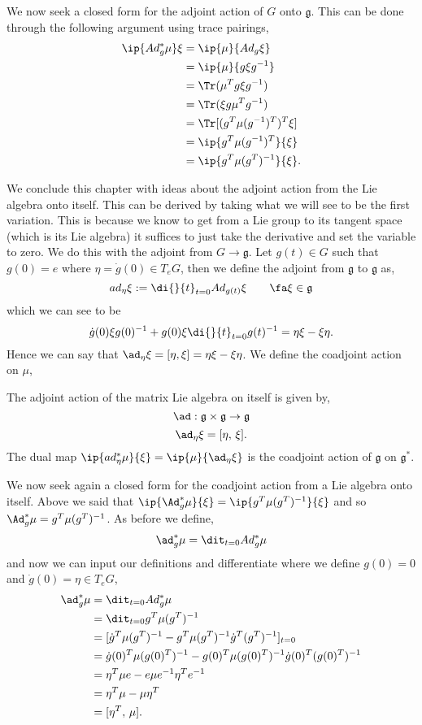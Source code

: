 \noindent
We now seek a closed form for the adjoint action of $G$ onto $\mathfrak{g}$. This can be done through the following argument using trace pairings,
\begin{align*}
  \ip {Ad^*_g \mu} \xi &= \ip {\mu} {Ad_g\xi}\\
  &= \ip {\mu} {g\xi g^{-1}}\\
  &= \Tr(\mu^Tg\xi g^{-1})\\
  &= \Tr(\xi g\mu^Tg^{-1})\\
  &= \Tr [(g^T\mu(g^{-1})^T)^T\xi]\\
  &= \ip{g^T\mu (g^{-1})^T} {\xi}\\
  &= \ip{g^T\mu (g^T)^{-1}} {\xi}.
\end{align*}

\noindent
We conclude this chapter with ideas about the adjoint action from the Lie algebra onto itself. This can be derived by taking what we will see to be the first variation. This is because we know to get from a Lie group to its tangent space (which is its Lie algebra) it suffices to just take the derivative and set the variable to zero. We do this with the adjoint from $G \to \mathfrak{g}$. Let $g(t) \in G$ such that $g(0) = e$ where $\eta = \dot g (0) \in T_eG$, then we define the adjoint from $\mathfrak{g}$ to $\mathfrak{g}$ as,
$$ ad_\eta \xi := \di {}{t} _{t = 0} Ad_{g(t)}\xi \qquad \fa \xi \in \mathfrak{g} $$
which we can see to be
$$ \dot g(0)\xi g(0)^{-1} + g(0)\xi \di {}{t}_{t=0} g(t)^{-1}= \eta\xi - \xi\eta. $$
Hence we can say that $\ad_{\eta}\xi = [\eta, \xi] = \eta\xi - \xi\eta$. We define the coadjoint action on $\mu$,
\begin{ndefi}
  The adjoint action of the matrix Lie algebra on itself is given by,
  $$ \ad : \mathfrak{g}\times \mathfrak{g} \to \mathfrak{g} $$
  $$ \ad_\eta \xi = [\eta,\, \xi]. $$
  The dual map $\ip{ad^*_\eta \mu}{\xi} = \ip{\mu}{\ad_\eta \xi}$ is the coadjoint action of $\mathfrak{g}$ on $\mathfrak{g}^*$.
\end{ndefi}
\noindent
We now seek again a closed form for the coadjoint action from a Lie algebra onto itself. Above we said that $\ip{\Ad^*_g\mu}{\xi} = \ip{g^T \mu (g^T)^{-1}}{\xi}$ and so $\Ad^*_g \mu = g^T \mu (g^T)^{-1}$. As before we define,
$$ \ad^*_g \mu = \dit_{t=0} Ad_g^* \mu $$
and now we can input our definitions and differentiate where we define $g(0) = 0$ and $\dot g (0) = \eta \in T_eG$,
\begin{align*}
  \ad^*_g \mu &= \dit_{t=0} Ad_g^* \mu \\
  &= \dit_{t=0} g^T \mu (g^T)^{-1} \\
  &= [\dot g^T \mu (g^T)^{-1} - g^T \mu (g^T)^{-1}\dot g^T (g^T)^{-1}]_{t=0} \\
  &= \dot g(0)^T \mu (g(0)^T)^{-1} - g(0)^T \mu (g(0)^T)^{-1}\dot g(0)^T (g(0)^T)^{-1} \\
  &= \eta^T \mu e - e \mu e^{-1} \eta^T e^{-1} \\
  &= \eta^T \mu - \mu \eta^T \\
  &= [\eta^T,\,\mu].
\end{align*}
